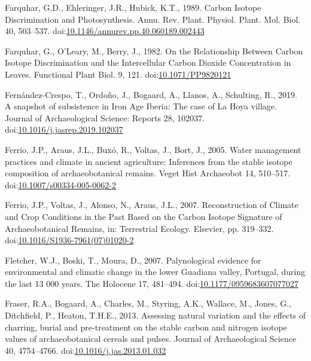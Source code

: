 \documentclass[review]{elsarticle} %
\newlength{\cslhangindent}
\newenvironment{CSLReferences}[2] %
 {%
  \setlength{\parindent}{0pt}
  \ifodd #1 \everypar{\setlength{\hangindent}{\cslhangindent}}\ignorespaces\fi
  \ifnum #2 > 0
  \setlength{\parskip}{#2\baselineskip}
  \fi
 }%
 {}
\begin{document}
\begin{CSLReferences}{1}{0}
\leavevmode{}%
Farquhar, G.D., Ehleringer, J.R., Hubick, K.T., 1989. Carbon {Isotope Discrimination} and {Photosynthesis}. Annu. Rev. Plant. Physiol. Plant. Mol. Biol. 40, 503--537. doi:\href{https://doi.org/10.1146/annurev.pp.40.060189.002443}{10.1146/annurev.pp.40.060189.002443}

\leavevmode{}%
Farquhar, G., O'Leary, M., Berry, J., 1982. On the {Relationship Between Carbon Isotope Discrimination} and the {Intercellular Carbon Dioxide Concentration} in {Leaves}. Functional Plant Biol. 9, 121. doi:\href{https://doi.org/10.1071/PP9820121}{10.1071/PP9820121}

\leavevmode{}%
Fernández-Crespo, T., Ordoño, J., Bogaard, A., Llanos, A., Schulting, R., 2019. A snapshot of subsistence in {Iron Age Iberia}: {The} case of {La Hoya} village. Journal of Archaeological Science: Reports 28, 102037. doi:\href{https://doi.org/10.1016/j.jasrep.2019.102037}{10.1016/j.jasrep.2019.102037}

\leavevmode{}%
Ferrio, J.P., Araus, J.L., Buxó, R., Voltas, J., Bort, J., 2005. Water management practices and climate in ancient agriculture: Inferences from the stable isotope composition of archaeobotanical remains. Veget Hist Archaeobot 14, 510--517. doi:\href{https://doi.org/10.1007/s00334-005-0062-2}{10.1007/s00334-005-0062-2}

\leavevmode{}%
Ferrio, J.P., Voltas, J., Alonso, N., Araus, J.L., 2007. Reconstruction of {Climate} and {Crop Conditions} in the {Past Based} on the {Carbon Isotope Signature} of {Archaeobotanical Remains}, in: Terrestrial {Ecology}. {Elsevier}, pp. 319--332. doi:\href{https://doi.org/10.1016/S1936-7961(07)01020-2}{10.1016/S1936-7961(07)01020-2}

\leavevmode{}%
Fletcher, W.J., Boski, T., Moura, D., 2007. Palynological evidence for environmental and climatic change in the lower {Guadiana} valley, {Portugal}, during the last 13 000 years. The Holocene 17, 481--494. doi:\href{https://doi.org/10.1177/0959683607077027}{10.1177/0959683607077027}

\leavevmode{}%
Fraser, R.A., Bogaard, A., Charles, M., Styring, A.K., Wallace, M., Jones, G., Ditchfield, P., Heaton, T.H.E., 2013. Assessing natural variation and the effects of charring, burial and pre-treatment on the stable carbon and nitrogen isotope values of archaeobotanical cereals and pulses. Journal of Archaeological Science 40, 4754--4766. doi:\href{https://doi.org/10.1016/j.jas.2013.01.032}{10.1016/j.jas.2013.01.032}


\end{CSLReferences}
\end{document}
